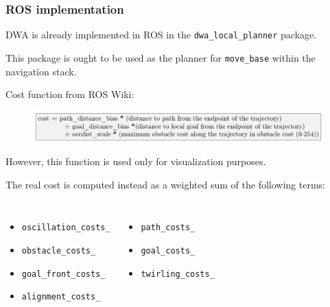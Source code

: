 \documentclass{beamer}
\begin{document}
\begin{frame}[allowframebreaks]
\frametitle{ROS implementation}

DWA is already implemented in ROS in the \texttt{dwa\_local\_planner} package.

\vspace{2em}

This package is ought to be used as the planner for \texttt{move\_base}
within the navigation stack.

\framebreak

Cost function from ROS Wiki:

\begin{figure}[H]
    \centering
    \includegraphics[scale=0.32]{img/other/cost_function_ros_wiki.png}
\end{figure}

\vspace{1em}

However, this function is used only for visualization purposes.

\vspace{2em}

The real cost is computed instead as a weighted sum of the following terms:

\begin{columns}


\begin{itemize}
  \item \texttt{oscillation\_costs\_}
  \item \texttt{obstacle\_costs\_}
  \item \texttt{goal\_front\_costs\_}
  \item \texttt{alignment\_costs\_}
\end{itemize}


\begin{itemize}
  \item \texttt{path\_costs\_}
  \item \texttt{goal\_costs\_}
  \item \texttt{twirling\_costs\_}
\end{itemize}

\end{columns}

\end{frame}
\end{document}
